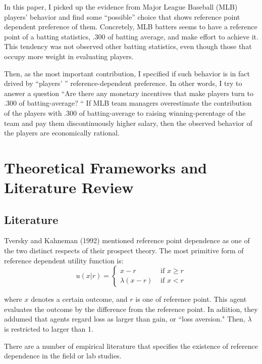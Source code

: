 \documentclass[dvipdfmx, 12pt]{article}
\begin{document}
In this paper, I picked up the evidence from Major League Baseball
(MLB) players' behavior and find some ``possible'' choice that
shows reference point dependent preference of them.
Concretely, MLB batters seems to have a reference point of
a batting statistics, .300 of batting average, and make effort
to achieve it. This tendency was not observed other batting statistics,
even though those that occupy more weight in evaluating players.

Then, as the most important contribution, I specified if
such behavior is in fact drived by ``players' ''
reference-dependent preference. In other words, I try to answer
a question ``Are there any monetary incentives that make players
turn to .300 of batting-average? `` If MLB team managers overestimate
the contribution of the players with .300 of batting-average to
raising winning-perentage of the team and pay them discontinuously
higher salary, then the observed behavior of the players are
economically rational.

\section{Theoretical Frameworks and Literature Review}

 \subsection{Literature}

  Tversky and Kahneman (1992) mentioned reference point dependence
  as one of the two distinct respects of their prospect theory.
  The most primitive form of reference dependent utility function is:
  \[
  u(x | r) = \begin{cases}
  x - r & \text{ if }x \geq r \\
  \lambda (x - r) & \text{ if }x < r
\end{cases}
  \]

  where $x$ denotes a certain outcome, and $r$ is one of
  reference point. This agent evaluates the outcome by the
  difference from the reference point. In adiition, they
  addumed that agents regard loss as larger than gain,
  or ``loss aversion." Then, $\lambda$ is restricted to larger than 1.

  There are a number of empirical literature that specifies the existence
  of reference dependence in the field or lab studies.
\end{document}
